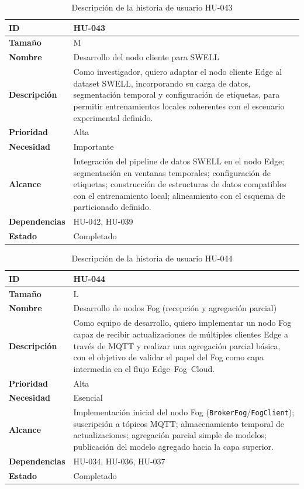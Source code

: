 \documentclass{report}
\begin{document}
\begin{table}[H]
\centering
\caption{Descripción de la historia de usuario HU-043}
\label{tab:hu043}
\begin{tabular}{|l|p{12cm}|}
\hline
\textbf{ID} & HU-043 \\ \hline
\textbf{Tamaño} & M \\ \hline
\textbf{Nombre} & Desarrollo del nodo cliente para SWELL \\ \hline
\textbf{Descripción} &
Como investigador, quiero adaptar el nodo cliente Edge al dataset SWELL, incorporando su carga de datos, segmentación temporal y configuración de etiquetas, para permitir entrenamientos locales coherentes con el escenario experimental definido. \\ \hline
\textbf{Prioridad} & Alta \\ \hline
\textbf{Necesidad} & Importante \\ \hline
\textbf{Alcance} &
Integración del pipeline de datos SWELL en el nodo Edge; segmentación en ventanas temporales; configuración de etiquetas; construcción de estructuras de datos compatibles con el entrenamiento local; alineamiento con el esquema de particionado definido. \\ \hline
\textbf{Dependencias} & HU-042, HU-039 \\ \hline
\textbf{Estado} & Completado \\ \hline
\end{tabular}
\end{table}



\begin{table}[H]
\centering
\caption{Descripción de la historia de usuario HU-044}
\label{tab:hu044}
\begin{tabular}{|l|p{12cm}|}
\hline
\textbf{ID} & HU-044 \\ \hline
\textbf{Tamaño} & L \\ \hline
\textbf{Nombre} & Desarrollo de nodos Fog (recepción y agregación parcial) \\ \hline
\textbf{Descripción} &
Como equipo de desarrollo, quiero implementar un nodo Fog capaz de recibir actualizaciones de múltiples clientes Edge a través de MQTT y realizar una agregación parcial básica, con el objetivo de validar el papel del Fog como capa intermedia en el flujo Edge--Fog--Cloud. \\ \hline
\textbf{Prioridad} & Alta \\ \hline
\textbf{Necesidad} & Esencial \\ \hline
\textbf{Alcance} &
Implementación inicial del nodo Fog (\texttt{BrokerFog}/\texttt{FogClient}); suscripción a tópicos MQTT; almacenamiento temporal de actualizaciones; agregación parcial simple de modelos; publicación del modelo agregado hacia la capa superior. \\ \hline
\textbf{Dependencias} & HU-034, HU-036, HU-037 \\ \hline
\textbf{Estado} & Completado \\ \hline
\end{tabular}
\end{table}
\end{document}
